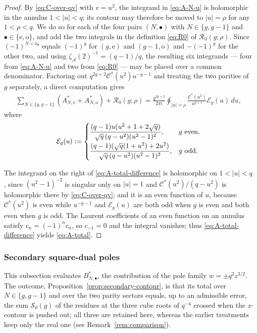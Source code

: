 \documentclass[a4paper,reqno]{amsart}
\numberwithin{equation}{section}
\theoremstyle{remark}
\theoremstyle{definition}
\newcommand{\A}{\mathcal{A}}
\newcommand{\zA}{\zeta_{\A}}
\begin{document}
\begin{proof}
By \eqref{eq:C-over-qv} with $v=u^2$, the integrand in \eqref{eq:A-N-u} is
holomorphic in the annulus $1<|u|<q$; its contour may therefore be moved to
$|u|=\rho$ for any $1<\rho<q$. We do so for each of the four pairs
$(N,\bullet)$ with $N\in\{g,g-1\}$ and $\bullet\in\{\mathrm e,\mathrm o\}$,
and add the two integrals in the definition \eqref{eq:R0} of
$\mathcal R_0(g;\rho)$. Since $(-1)^{N+\nu_\bullet}$ equals $(-1)^g$ for
$(g,\mathrm e)$ and $(g-1,\mathrm o)$ and $-(-1)^g$ for the other two, and
using $\zA(2)^{-1}=(q-1)/q$, the resulting six integrands --- four from
\eqref{eq:A-N-u} and two from \eqref{eq:R0} --- may be placed over a common
denominator. Factoring out $q^{2g+2}\mathcal C^*(u^2)u^{-g-1}$ and
treating the two parities of $g$ separately, a direct computation gives
\begin{align}\label{eq:A-total-difference}
\sum_{N\in\{g,g-1\}}\left(A_{N,\mathrm e}^{*}+A_{N,\mathrm o}^{*}\right)
+\mathcal R_0(g;\rho)
=\frac{q^{2g+2}}{2\pi i}\oint_{|u|=\rho}\frac{\mathcal C^*(u^2)}{u^{g+1}}\mathcal E_g(u)\,du,
\end{align}
where
$$
\mathcal E_g(u)
:=
\begin{cases}
\displaystyle
\frac{(q-1)u(u^2+1+2\sqrt q)}
{\sqrt q\,(q-u^2)(u^2-1)^2},
& g\ {\rm even},\\[8pt]
\displaystyle
\frac{(q-1)(\sqrt q(1+u^2)+2u^2)}
{\sqrt q\,(q-u^2)(u^2-1)^2},
& g\ {\rm odd}.
\end{cases}
$$

The integrand on the right of \eqref{eq:A-total-difference} is holomorphic
on $1<|u|<q$, since $(u^2-1)^{-2}$ is singular only on $|u|=1$ and
$\mathcal C^*(u^2)/(q-u^2)$ is holomorphic there by \eqref{eq:C-over-qv};
and it is an even function of
$u$, because $\mathcal C^*(u^2)$ is even while $u^{-g-1}$ and
$\mathcal E_g(u)$ are both odd when $g$ is even and both even when $g$ is
odd. The Laurent coefficients of an even function on an annulus satisfy
$c_n=(-1)^nc_n$, so $c_{-1}=0$ and the integral vanishes; thus
\eqref{eq:A-total-difference} yields \eqref{eq:A-total}.
\end{proof}

\subsubsection{Secondary square-dual poles}\label{sec:secondary-poles}

This subsection evaluates $B_{N,\bullet}^{*}$, the contribution of the pole
family $w=\pm q^2z^{3/2}$. The outcome, Proposition~\ref{prop:secondary-contour},
is that its total over $N\in\{g,g-1\}$ and over the two parity sectors
equals, up to an admissible error, the sum $\mathcal S_0(g)$ of the residues
at the three cube roots of $q^{-4}$ crossed when the $z$-contour is pushed
out; all three are retained here, whereas the earlier treatments keep only
the real one (see Remark~\ref{rem:comparison}).
\end{document}
